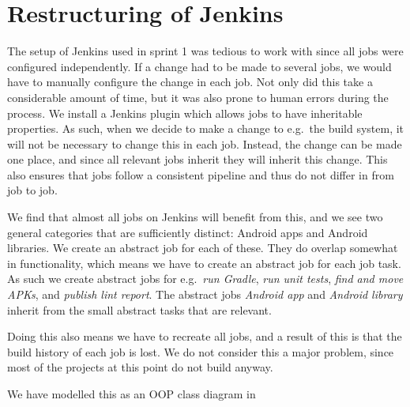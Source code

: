 



\chapter{Restructuring of Jenkins}
The setup of Jenkins used in sprint 1 was tedious to work with since all jobs were configured independently. If a change had to be made to several jobs, we would have to manually configure the change in each job. Not only did this take a considerable amount of time, but it was also prone to human errors during the process. We install a Jenkins plugin which allows jobs to have inheritable properties. As such, when we decide to make a change to e.g.\ the build system, it will not be necessary to change this in each job. Instead, the change can be made one place, and since all relevant jobs inherit they will inherit this change. This also ensures that jobs follow a consistent pipeline and thus do not differ in from job to job.

We find that almost all jobs on Jenkins will benefit from this, and we see two general categories that are sufficiently distinct: Android apps and Android libraries. We create an abstract job for each of these. They do overlap somewhat in functionality, which means we have to create an abstract job for each job task. As such we create abstract jobs for e.g.\ \emph{run Gradle}, \emph{run unit tests}, \emph{find and move APKs}, and \emph{publish lint report}. The abstract jobs \emph{Android app} and \emph{Android library} inherit from the small abstract tasks that are relevant.

Doing this also means we have to recreate all jobs, and a result of this is that the build history of each job is lost. We do not consider this a major problem, since most of the projects at this point do not build anyway.

We have modelled this as an OOP class diagram in 





